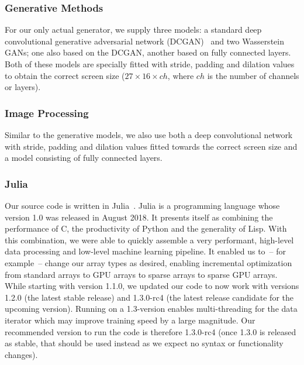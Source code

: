 \subsubsection{Generative Methods}

For our only actual generator, we supply three models: a standard deep
convolutional generative adversarial network
(DCGAN)~\cite{radfordUnsupervisedRepresentationLearning2016} and two
Wasserstein GANs; one also based on the DCGAN, another based on
fully connected layers. Both of these models are specially fitted with
stride, padding and dilation values to obtain the correct screen size
($27 \times 16 \times ch$, where $ch$ is the number of channels or
layers).

\subsubsection{Image Processing}
\label{sec:image-processing}

Similar to the generative models, we also use both a deep
convolutional network with stride, padding and dilation values fitted
towards the correct screen size and a model consisting of
fully connected layers.

\subsubsection{Julia}
\label{sec:julia}

Our source code is written in
Julia~\cite{bezansonJuliaFreshApproach2017}. Julia is a programming
language whose version 1.0 was released in August 2018. It presents
itself as combining the performance of C, the productivity of Python
and the generality of Lisp. With this combination, we were able to
quickly assemble a very performant, high-level data processing and
low-level machine learning pipeline. It enabled us to~-- for
example~-- change our array types as desired, enabling incremental
optimization from standard arrays to GPU arrays to sparse arrays to
sparse GPU arrays. While starting with version 1.1.0, we updated our
code to now work with versions 1.2.0 (the latest stable release) and
1.3.0-rc4 (the latest release candidate for the upcoming version).
Running on a 1.3-version enables multi-threading for the data iterator
which may improve training speed by a large magnitude. Our recommended
version to run the code is therefore 1.3.0-rc4 (once 1.3.0 is released
as stable, that should be used instead as we expect no syntax or
functionality changes).

